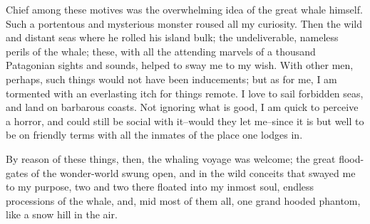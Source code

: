 Chief among these motives was the overwhelming idea of the great
whale himself. Such a portentous and mysterious monster roused all
my curiosity. Then the wild and distant seas where he rolled his
island bulk; the undeliverable, nameless perils of the whale; these,
with all the attending marvels of a thousand Patagonian sights and
sounds, helped to sway me to my wish. With other men, perhaps, such
things would not have been inducements; but as for me, I am tormented
with an everlasting itch for things remote. I love to sail forbidden
seas, and land on barbarous coasts. Not ignoring what is good, I am
quick to perceive a horror, and could still be social with it--would
they let me--since it is but well to be on friendly terms with all
the inmates of the place one lodges in.

By reason of these things, then, the whaling voyage was welcome; the
great flood-gates of the wonder-world swung open, and in the wild
conceits that swayed me to my purpose, two and two there floated into
my inmost soul, endless processions of the whale, and, mid most of
them all, one grand hooded phantom, like a snow hill in the air.
\bye